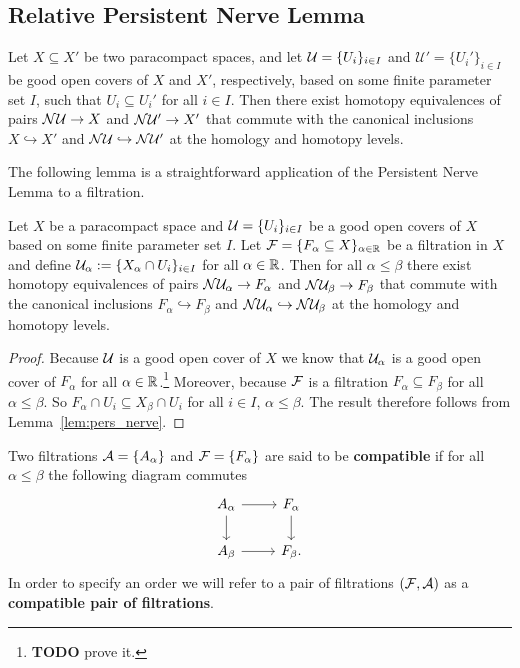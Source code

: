 
\subsection{Relative Persistent Nerve Lemma}

\begin{lemma}\label{lem:pers_nerve}
  Let $X\subseteq X'$ be two paracompact spaces, and let $\mathcal{U} = \{U_i\}_{i\in I}$ and $\mathcal{U}' = \{U_i'\}_{i\in I}$ be good open covers of $X$ and $X'$, respectively, based on some finite parameter set $I$, such that $U_i\subseteq U_i'$ for all $i\in I$.
  Then there exist homotopy equivalences of pairs $\mathcal{N}\mathcal{U}\to X$ and $\mathcal{N}\mathcal{U}'\to X'$ that commute with the canonical inclusions $X \hookrightarrow X'$ and $\mathcal{N}\mathcal{U}\hookrightarrow \mathcal{N}\mathcal{U}'$ at the homology and homotopy levels.
\end{lemma}

The following lemma is a straightforward application of the Persistent Nerve Lemma to a filtration.

\begin{lemma}\label{lem:pers_nerve_filt}
  Let $X$ be a paracompact space and $\mathcal{U} = \{U_i\}_{i\in I}$ be a good open covers of $X$ based on some finite parameter set $I$.
  Let $\mathcal{F} = \{F_\alpha\subseteq X\}_{\alpha\in\mathbb{R}}$ be a filtration in $X$ and define $\mathcal{U}_\alpha := \{X_\alpha\cap U_i\}_{i\in I}$ for all $\alpha\in\mathbb{R}$.
  Then for all $\alpha\leq\beta$ there exist homotopy equivalences of pairs $\mathcal{N}\mathcal{U}_\alpha\to F_\alpha$ and $\mathcal{N}\mathcal{U}_\beta\to F_\beta$ that commute with the canonical inclusions $F_\alpha \hookrightarrow F_\beta$ and $\mathcal{N}\mathcal{U}_\alpha\hookrightarrow \mathcal{N}\mathcal{U}_\beta$ at the homology and homotopy levels.
\end{lemma}
\begin{proof}
  Because $\mathcal{U}$ is a good open cover of $X$ we know that $\mathcal{U}_\alpha$ is a good open cover of $F_\alpha$ for all $\alpha\in\mathbb{R}$.\footnote{\textbf{TODO} prove it.}
  Moreover, because $\mathcal{F}$ is a filtration $F_\alpha\subseteq F_\beta$ for all $\alpha\leq\beta$.
  So $F_\alpha\cap U_i\subseteq X_\beta\cap U_i$ for all $i\in I$, $\alpha\leq\beta$.
  The result therefore follows from Lemma~\ref{lem:pers_nerve}.
\end{proof}

\begin{definition}
  Two filtrations $\mathcal{A} = \{A_\alpha\}$ and $\mathcal{F} = \{F_\alpha\}$ are said to be \textbf{compatible} if for all $\alpha\leq\beta$ the following diagram commutes
  \begin{equation}\label{dgm:compatible}
    \begin{tikzcd}
      A_\alpha\arrow{r}\arrow{d} &
      F_\alpha\arrow{d}\\
      A_\beta\arrow{r} &
      F_\beta.
    \end{tikzcd}
  \end{equation}
  In order to specify an order we will refer to a pair of filtrations $(\mathcal{F}, \mathcal{A})$ as a \textbf{compatible pair of filtrations}.
\end{definition}

